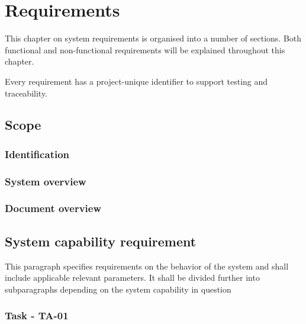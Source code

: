 \label{chp_requirements}
\chapter{Requirements}
This chapter on system requirements is organised into a number of sections. Both functional and non-functional requirements will be explained throughout this chapter.

Every requirement has a project-unique identifier to support testing and traceability.

\section{Scope}

\subsection{Identification}


\subsection{System overview}

\subsection{Document overview}


\section{System capability requirement}
This paragraph specifies requirements on the behavior of the system and shall include applicable relevant parameters. It shall be divided further into subparagraphs depending on the system capability in question

\subsection{Task - TA-01}

